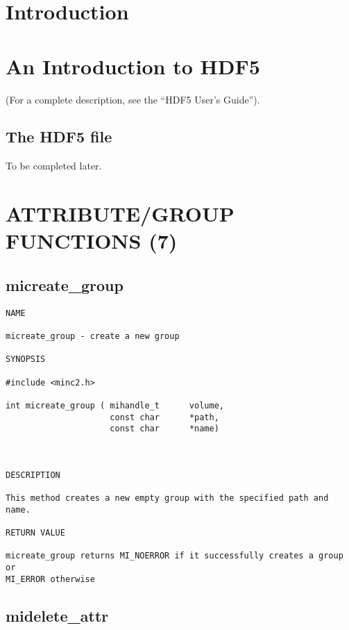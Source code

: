 \documentclass{article}
\begin{document}
\section{Introduction}



\section{An Introduction to HDF5}

(For a complete description, see the ``HDF5 User's Guide'').

\subsection{The HDF5 file}

To be completed later. 

\section{ATTRIBUTE/GROUP FUNCTIONS (7)}
\subsection{micreate\_group}

\begin{verbatim}
NAME 

micreate_group - create a new group

SYNOPSIS

#include <minc2.h>

int micreate_group ( mihandle_t      volume,
                     const char      *path,
                     const char      *name)
                    
                       
                                
DESCRIPTION

This method creates a new empty group with the specified path and name.

RETURN VALUE

micreate_group returns MI_NOERROR if it successfully creates a group or 
MI_ERROR otherwise

\end{verbatim}

\subsection{midelete\_attr}
\end{document}
